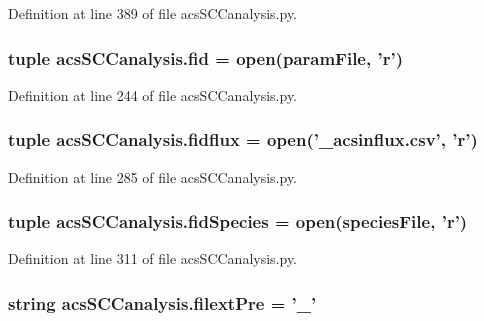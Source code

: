 Definition at line 389 of file acs\-S\-C\-Canalysis.\-py.

\hypertarget{a00096_a424e2204e89264a827e6cad861ebcbc1}{
\subsubsection[{fid}]{\setlength{\rightskip}{0pt plus 5cm}tuple acs\-S\-C\-Canalysis.\-fid = open({\bf param\-File}, '{\bf r}')}}\label{a00096_a424e2204e89264a827e6cad861ebcbc1}


Definition at line 244 of file acs\-S\-C\-Canalysis.\-py.

\hypertarget{a00096_a0c40e4d9928e8df792b31c7a431d3fba}{
\subsubsection[{fidflux}]{\setlength{\rightskip}{0pt plus 5cm}tuple acs\-S\-C\-Canalysis.\-fidflux = open('\-\_\-acsinflux.\-csv', '{\bf r}')}}\label{a00096_a0c40e4d9928e8df792b31c7a431d3fba}


Definition at line 285 of file acs\-S\-C\-Canalysis.\-py.

\hypertarget{a00096_aba2f982879776e057b35971b3653549e}{
\subsubsection[{fid\-Species}]{\setlength{\rightskip}{0pt plus 5cm}tuple acs\-S\-C\-Canalysis.\-fid\-Species = open({\bf species\-File}, '{\bf r}')}}\label{a00096_aba2f982879776e057b35971b3653549e}


Definition at line 311 of file acs\-S\-C\-Canalysis.\-py.

\hypertarget{a00096_a60ff937c050eef601bd84134d1913d8a}{
\subsubsection[{filext\-Pre}]{\setlength{\rightskip}{0pt plus 5cm}string acs\-S\-C\-Canalysis.\-filext\-Pre = '\-\_\-'}}\label{a00096_a60ff937c050eef601bd84134d1913d8a}


